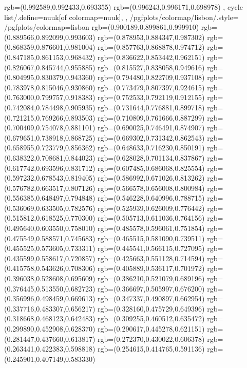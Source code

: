 {{{			rgb=(0.992589,0.992433,0.693355)
			rgb=(0.996243,0.996171,0.698978)
		},
	cycle list/.define={nuuk}{[of colormap=nuuk]},
	},
	/pgfplots/colormap/lisbon/.style={
		/pgfplots/colormap={lisbon}{%
			rgb=(0.900189,0.899861,0.999910)
			rgb=(0.889566,0.892099,0.993603)
			rgb=(0.878953,0.884347,0.987302)
			rgb=(0.868359,0.876601,0.981004)
			rgb=(0.857763,0.868878,0.974712)
			rgb=(0.847185,0.861153,0.968432)
			rgb=(0.836622,0.853442,0.962151)
			rgb=(0.826067,0.845744,0.955885)
			rgb=(0.815527,0.838058,0.949616)
			rgb=(0.804995,0.830379,0.943360)
			rgb=(0.794480,0.822709,0.937108)
			rgb=(0.783978,0.815046,0.930860)
			rgb=(0.773479,0.807397,0.924615)
			rgb=(0.763000,0.799757,0.918383)
			rgb=(0.752533,0.792119,0.912155)
			rgb=(0.742084,0.784498,0.905935)
			rgb=(0.731644,0.776881,0.899718)
			rgb=(0.721215,0.769266,0.893503)
			rgb=(0.710809,0.761666,0.887299)
			rgb=(0.700409,0.754078,0.881101)
			rgb=(0.690025,0.746491,0.874907)
			rgb=(0.679651,0.738918,0.868725)
			rgb=(0.669302,0.731342,0.862543)
			rgb=(0.658955,0.723779,0.856362)
			rgb=(0.648633,0.716230,0.850191)
			rgb=(0.638322,0.708681,0.844023)
			rgb=(0.628028,0.701134,0.837867)
			rgb=(0.617742,0.693596,0.831712)
			rgb=(0.607485,0.686068,0.825554)
			rgb=(0.597232,0.678543,0.819405)
			rgb=(0.586992,0.671026,0.813262)
			rgb=(0.576782,0.663517,0.807126)
			rgb=(0.566578,0.656008,0.800984)
			rgb=(0.556385,0.648497,0.794848)
			rgb=(0.546228,0.640996,0.788715)
			rgb=(0.536069,0.633505,0.782576)
			rgb=(0.525939,0.626009,0.776442)
			rgb=(0.515812,0.618525,0.770300)
			rgb=(0.505713,0.611036,0.764156)
			rgb=(0.495640,0.603550,0.758010)
			rgb=(0.485578,0.596061,0.751854)
			rgb=(0.475549,0.588571,0.745683)
			rgb=(0.465515,0.581090,0.739511)
			rgb=(0.455525,0.573605,0.733311)
			rgb=(0.445541,0.566115,0.727095)
			rgb=(0.435599,0.558617,0.720857)
			rgb=(0.425663,0.551128,0.714594)
			rgb=(0.415758,0.543626,0.708306)
			rgb=(0.405889,0.536117,0.701972)
			rgb=(0.396038,0.528608,0.695609)
			rgb=(0.386210,0.521079,0.689196)
			rgb=(0.376445,0.513550,0.682723)
			rgb=(0.366697,0.505997,0.676200)
			rgb=(0.356996,0.498459,0.669613)
			rgb=(0.347337,0.490897,0.662954)
			rgb=(0.337716,0.483307,0.656217)
			rgb=(0.328160,0.475729,0.649396)
			rgb=(0.318668,0.468123,0.642483)
			rgb=(0.309255,0.460512,0.635472)
			rgb=(0.299890,0.452908,0.628370)
			rgb=(0.290617,0.445278,0.621151)
			rgb=(0.281447,0.437660,0.613817)
			rgb=(0.272370,0.430022,0.606378)
			rgb=(0.263441,0.422383,0.598818)
			rgb=(0.254615,0.414765,0.591136)
			rgb=(0.245901,0.407149,0.583330)
}}}
